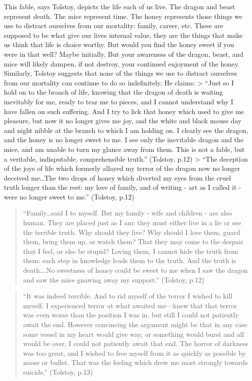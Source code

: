 \documentclass[]{article}
\begin{document}
This fable, says Tolstoy, depicts the life each of us live. The dragon
and beast represent death. The mice represent time. The honey represents
those things we use to distract ourselves from our mortality: family,
career, etc. These are supposed to be what give our lives internal
value, they are the things that make us think that life is choice
worthy. But would you find the honey sweet if you were in that well?
Maybe initially. But your awareness of the dragon, beast, and mice will
likely dampen, if not destroy, your continued enjoyment of the honey.
Similarly, Tolstoy suggests that none of the things we use to distract
ourselves from our mortality can continue to do so indefinitely. He
claims: \textgreater{} ``Just so I hold on to the branch of life,
knowing that the dragon of death is waiting inevitably for me, ready to
tear me to pieces, and I cannot understand why I have fallen on such
suffering. And I try to lick that honey which used to give me pleasure,
but now it no longer gives me joy, and the white and black mouse day and
night nibble at the branch to which I am holding on. I clearly see the
dragon, and the honey is no longer sweet to me. I see only the
inevitable dragon and the mice, and am unable to turn my glance away
from them. This is not a fable, but a veritable, indisputable,
comprehensible truth.'' (Tolstoy, p.12) \textgreater{} ``The deception
of the joys of life which formerly allayed my terror of the dragon now
no longer deceived me\ldots{}The two drops of honey which diverted my
eyes from the cruel truth longer than the rest: my love of family, and
of writing - art as I called it - were no longer sweet to me.''
(Tolstoy, p.12)

\begin{quote}
``Family\ldots{}said I to myself. But my family - wife and children -
are also human. They are placed just as I am: they must either live in a
lie or see the terrible truth. Why should they live? Why should I love
them, guard them, bring them up, or watch them? That they may come to
the despair that I feel, or else be stupid? Loving them, I cannot hide
the truth from them: each step in knowledge leads them to the truth. And
the truth is death\ldots{}.No sweetness of honey could be sweet to me
when I saw the dragon and saw the mice gnawing away my support.''
(Tolstoy, p.12)
\end{quote}

\begin{quote}
``It was indeed terrible. And to rid myself of the terror I wished to
kill myself. I experienced terror at what awaited me---knew that that
terror was even worse than the position I was in, but still I could not
patiently await the end. However convincing the argument might be that
in any case some vessel in my heart would give way, or something would
burst and all would be over, I could not patiently await that end. The
horror of darkness was too great, and I wished to free myself from it as
quickly as possible by noose or bullet. That was the feeling which drew
me most strongly towards suicide.'' (Tolstoy, p.13)
\end{quote}
\end{document}
